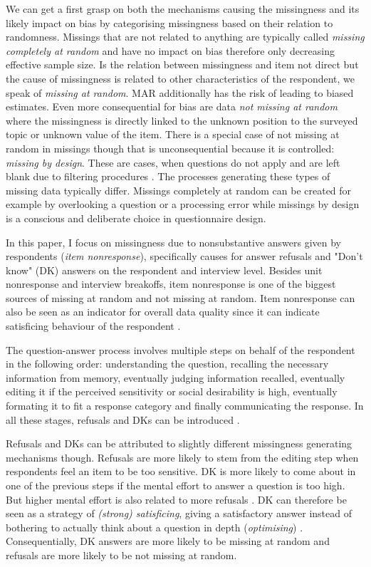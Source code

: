 \documentclass[a4paper,12pt]{article}
\begin{document}
We can get a first grasp on both the mechanisms causing the missingness and its likely impact on bias by categorising missingness based on their relation to randomness. Missings that are not related to anything are typically called \textit{missing completely at random} and have no impact on bias therefore only decreasing effective sample size. Is the relation between missingness and item not direct but the cause of missingness is related to other characteristics of the respondent, we speak of \textit{missing at random}. MAR additionally has the risk of leading to biased estimates. Even more consequential for bias are data \textit{not missing at random} where the missingness is directly linked to the unknown position to the surveyed topic or unknown value of the item. There is a special case of not missing at random in missings though that is unconsequential because it is controlled: \textit{missing by design}. These are cases, when questions do not apply and are left blank due to filtering procedures \citep[155]{deleeuwPreventionTreatmentItem2003}. The processes generating these types of missing data typically differ. Missings completely at random can be created for example by overlooking a question or a processing error while missings by design is a conscious and deliberate choice in questionnaire design.

In this paper, I focus on missingness due to nonsubstantive answers given by respondents (\textit{item nonresponse}), specifically causes for answer refusals and "Don't know" (DK) answers on the respondent and interview level. Besides unit nonresponse and interview breakoffs, item nonresponse is one of the biggest sources of missing at random and not missing at random. Item nonresponse can also be seen as an indicator for overall data quality since it can indicate satisficing behaviour of the respondent \citep{krosnickResponseStrategiesCoping1991}.

The question-answer process involves multiple steps on behalf of the respondent in the following order: understanding the question, recalling the necessary information from memory, eventually judging information recalled, eventually editing it if the perceived sensitivity or social desirability is high, eventually formating it to fit a response category and finally communicating the response. In all these stages, refusals and DKs can be introduced \citep[pp. 159f]{deleeuwPreventionTreatmentItem2003}.

Refusals and DKs can be attributed to slightly different missingness generating mechanisms though. Refusals are more likely to stem from the editing step when respondents feel an item to be too sensitive. DK is more likely to come about in one of the previous steps if the mental effort to answer a question is too high. But higher mental effort is also related to more refusals \citep{shoemakerItemNonresponseDistinguishing2002}. DK can therefore be seen as a strategy of \textit{(strong) satisficing}, giving a satisfactory answer instead of bothering to actually think about a question in depth (\textit{optimising}) \citep[219]{krosnickResponseStrategiesCoping1991}. Consequentially, DK answers are more likely to be missing at random and refusals are more likely to be not missing at random.
\end{document}
